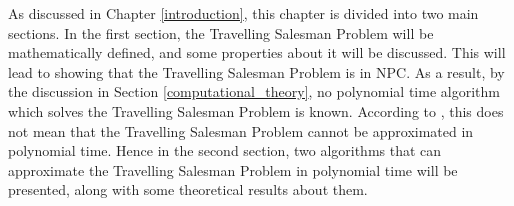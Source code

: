 \documentclass[12pt]{article}
\numberwithin{equation}{subsection}
\numberwithin{table}{subsection}
\numberwithin{algorithm}{subsection}
\numberwithin{figure}{subsection}
\begin{document}
\newpage
{}
As discussed in Chapter \ref{introduction}, this chapter is divided into two main sections. In the first section, the Travelling Salesman Problem will be mathematically defined, and some properties about it will be discussed. This will lead to showing that the Travelling Salesman Problem is in NPC. As a result, by the discussion in Section \ref{computational_theory}, no polynomial time algorithm which solves the Travelling Salesman Problem is known. According to \cite{cormen_leiserson_rivest_stein}, this does not mean that the Travelling Salesman Problem cannot be approximated in polynomial time. Hence in the second section, two algorithms that can approximate the Travelling Salesman Problem in polynomial time will be presented, along with some theoretical results about them.
\end{document}
